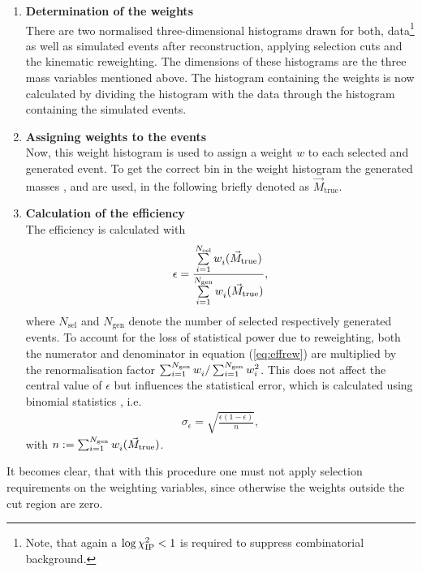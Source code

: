 \begin{enumerate}
    \item \textbf{Determination of the weights} \\
          There are two normalised three-dimensional histograms drawn for both, data\footnote{Note, that again a $\log \chi^2_{\text{IP}} < 1$ is required to suppress combinatorial background.} as well as simulated events after reconstruction, applying selection cuts and the kinematic reweighting. 
          The dimensions of these histograms are the three mass variables mentioned above.
          The histogram containing the weights is now calculated by dividing the histogram with the data through the histogram containing the simulated events.
    \item \textbf{Assigning weights to the events} \\
          Now, this weight histogram is used to assign a weight $w$ to each selected and generated event.
          To get the correct bin in the weight histogram the generated masses \Mtrue{\Dz\proton}, \Mtrue{\Dz\mun} and \Mtrue{\Dz\proton\mun} are used, in the following briefly denoted as $\vec{M}_\text{true}$.
    \item \textbf{Calculation of the efficiency} \\
          The efficiency is calculated with
          \begin{align}
              \epsilon = \frac{\sum\limits_{i=1}^{N_\text{sel}} w^{\text{}}_{i}(\vec{M}_\text{true})}{\sum\limits_{i=1}^{N_\text{gen}} w^{\text{}}_{i}(\vec{M}_\text{true})}, \label{eq:effrew}
          \end{align}
          where $N_\text{sel}$ and $N_\text{gen}$ denote the number of selected respectively generated events.
          To account for the loss of statistical power due to reweighting, both the numerator and denominator in equation (\ref{eq:effrew}) are multiplied by the renormalisation factor $\sum_{i=1}^{N_\text{gen}} w^{\text{}}_{i} / \sum_{i=1}^{N_\text{gen}} w^{\text{2}}_{i}$. 
          This does not affect the central value of $\epsilon$ but influences the statistical error, which is calculated using binomial statistics \cite{Efficiency}, i.e.
          \begin{align}
              \sigma_\epsilon = \sqrt{\frac{\epsilon(1-\epsilon)}{n}}, 
          \end{align}
          with $n := \sum_{i=1}^{N_\text{gen}} w^{\text{}}_{i}(\vec{M}_\text{true})$.
\end{enumerate}
It becomes clear, that with this procedure one must not apply selection requirements on the weighting variables, since otherwise the weights outside the cut region are zero. 
